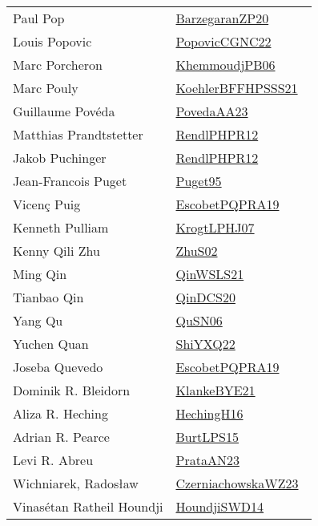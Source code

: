 {\begin{longtable}{p{4cm}p{20cm}}
Paul Pop & \href{works/BarzegaranZP20.pdf}{BarzegaranZP20}~\cite{BarzegaranZP20}\\
Louis Popovic & \href{works/PopovicCGNC22.pdf}{PopovicCGNC22}~\cite{PopovicCGNC22}\\
Marc Porcheron & \href{works/KhemmoudjPB06.pdf}{KhemmoudjPB06}~\cite{KhemmoudjPB06}\\
Marc Pouly & \href{works/KoehlerBFFHPSSS21.pdf}{KoehlerBFFHPSSS21}~\cite{KoehlerBFFHPSSS21}\\
Guillaume Pov{\'{e}}da & \href{works/PovedaAA23.pdf}{PovedaAA23}~\cite{PovedaAA23}\\
Matthias Prandtstetter & \href{works/RendlPHPR12.pdf}{RendlPHPR12}~\cite{RendlPHPR12}\\
Jakob Puchinger & \href{works/RendlPHPR12.pdf}{RendlPHPR12}~\cite{RendlPHPR12}\\
Jean{-}Francois Puget & \href{works/Puget95.pdf}{Puget95}~\cite{Puget95}\\
Vicen{\c{c}} Puig & \href{works/EscobetPQPRA19.pdf}{EscobetPQPRA19}~\cite{EscobetPQPRA19}\\
Kenneth Pulliam & \href{works/KrogtLPHJ07.pdf}{KrogtLPHJ07}~\cite{KrogtLPHJ07}\\
Kenny Qili Zhu & \href{works/ZhuS02.pdf}{ZhuS02}~\cite{ZhuS02}\\
Ming Qin & \href{works/QinWSLS21.pdf}{QinWSLS21}~\cite{QinWSLS21}\\
Tianbao Qin & \href{works/QinDCS20.pdf}{QinDCS20}~\cite{QinDCS20}\\
Yang Qu & \href{works/QuSN06.pdf}{QuSN06}~\cite{QuSN06}\\
Yuchen Quan & \href{}{ShiYXQ22}~\cite{ShiYXQ22}\\
Joseba Quevedo & \href{works/EscobetPQPRA19.pdf}{EscobetPQPRA19}~\cite{EscobetPQPRA19}\\
Dominik R. Bleidorn & \href{works/KlankeBYE21.pdf}{KlankeBYE21}~\cite{KlankeBYE21}\\
Aliza R. Heching & \href{works/HechingH16.pdf}{HechingH16}~\cite{HechingH16}\\
Adrian R. Pearce & \href{works/BurtLPS15.pdf}{BurtLPS15}~\cite{BurtLPS15}\\
Levi R. Abreu & \href{works/PrataAN23.pdf}{PrataAN23}~\cite{PrataAN23}\\
Wichniarek, Radosław & \href{works/CzerniachowskaWZ23.pdf}{CzerniachowskaWZ23}~\cite{CzerniachowskaWZ23}\\
Vinas{\'{e}}tan Ratheil Houndji & \href{works/HoundjiSWD14.pdf}{HoundjiSWD14}~\cite{HoundjiSWD14}\\

\end{longtable}}
